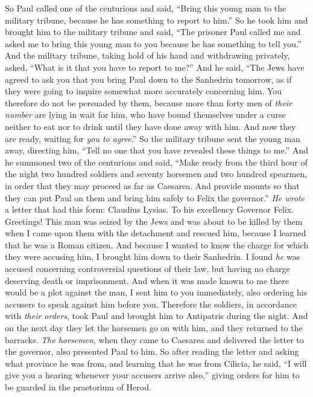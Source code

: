 \begin{biblechapter}
\verse So Paul called one of the centurions and said, “Bring this young man to the military tribune, because he has something to report to him.”
\verse So he took him and brought him to the military tribune and said, “The prisoner Paul called me and asked me to bring this young man to you because he has something to tell you.”
\verse And the military tribune, taking hold of his hand and withdrawing privately, asked, “What is it that you have to report to me?”
\verse And he said, “The Jews have agreed to ask you that you bring Paul down to the Sanhedrin tomorrow, as if they were going to inquire somewhat more accurately concerning him.
\verse You therefore do not be persuaded by them, because more than forty men of \textit{their number} are lying in wait for him, who have bound themselves under a curse neither to eat nor to drink until they have done away with him. And now they are ready, waiting for \textit{you to agree}.”
\verse So the military tribune sent the young man away, directing him, “Tell no one that you have revealed these things to me.”
\verse And he summoned two of the centurions and said, “Make ready from the third hour of the night two hundred soldiers and seventy horsemen and two hundred spearmen, in order that they may proceed as far as Caesarea.
\verse And provide mounts so that they can put Paul on them and bring him safely to Felix the governor.”
\verse \textit{He wrote} a letter that had this form:
\verse Claudius Lysias. To his excellency Governor Felix. Greetings!
\verse This man was seized by the Jews and was about to be killed by them when I came upon them with the detachment and rescued him, because I learned that he was a Roman citizen.
\verse And because I wanted to know the charge for which they were accusing him, I brought him down to their Sanhedrin.
\verse I found \textit{he} was accused concerning controversial questions of their law, but having no charge deserving death or imprisonment.
\verse And when it was made known to me there would be a plot against the man, I sent him to you immediately, also ordering his accusers to speak against him before you.
\verse Therefore the soldiers, in accordance with \textit{their orders}, took Paul and brought him to Antipatris during the night.
\verse And on the next day they let the horsemen go on with him, and they returned to the barracks.
\verse \textit{The horsemen}, when they came to Caesarea and delivered the letter to the governor, also presented Paul to him.
\verse So after reading the letter and asking what province he was from, and learning that he was from Cilicia,
\verse he said, “I will give you a hearing whenever your accusers arrive also,” giving orders for him to be guarded in the praetorium of Herod.
\end{biblechapter}

